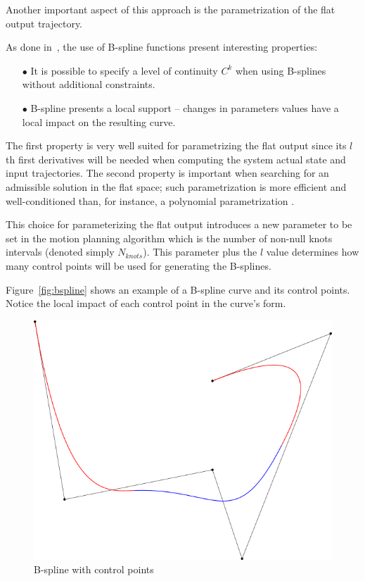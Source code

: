 Another important aspect of this approach is the parametrization of 
the flat output trajectory.


As done in~\cite{Milam2003}, the use
of B-spline functions present interesting properties:
\begin{itemize}


 \item [$\bullet$] It is possible to specify a level of continuity $C^k$ when using
 B-splines without additional constraints.
 
 \item [$\bullet$] B-spline presents a local support -- changes in parameters values have a 
 local impact on the resulting curve.
 
 
\end{itemize}
The first property is very well suited for parametrizing the flat output since
its $l$th first derivatives will be needed when computing the system actual state
and input trajectories. The second property is important when searching for an
admissible solution in the flat space; such parametrization is more efficient
and well-conditioned than, for instance, a polynomial parametrization \cite{Milam2003}.


This choice for parameterizing the flat output introduces a new parameter to be set in
the motion planning algorithm which is the number of non-null knots intervals 
(denoted simply $N_{knots}$). This parameter plus the $l$ value determines how many 
control points will be used for generating the B-splines.

Figure~\ref{fig:bspline} shows an example of a B-spline curve and its control points. Notice the local impact of each control point in the curve's form.

\begin{figure}[!h]\centering
  \includegraphics[width=.5\linewidth]{./images/B-spline_curve.png} %
  \caption{B-spline with control points\label{fig:bspline}}
\label{fig:res}
\end{figure}

